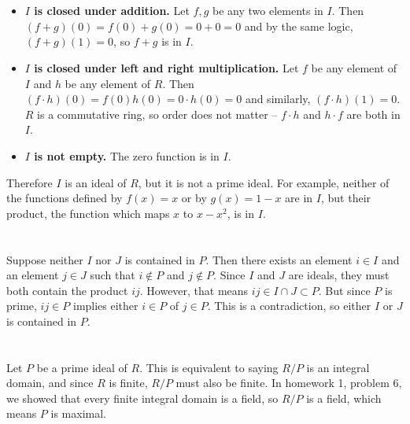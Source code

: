 \documentclass[12pt]{article}
\begin{document}
\section{}
\noindent{}\bigskip\par
\begin{itemize}
    \item \textbf{$I$ is closed under addition.} Let $f,g$ be any two elements in $I$. Then $(f+g)(0)=f(0)+g(0)=0+0=0$ and by the same logic, $(f+g)(1)=0$, so $f+g$ is in $I$.
    \item \textbf{$I$ is closed under left and right multiplication.} Let $f$ be any element of $I$ and $h$ be any element of $R$. Then $(f \cdot h)(0)=f(0)h(0)=0\cdot h(0)=0$ and similarly, $(f \cdot h)(1)=0$. $R$ is a commutative ring, so order does not matter -- $f \cdot h$ and $h \cdot f$ are both in $I$.
    \item \textbf{$I$ is not empty.} The zero function is in $I$.
\end{itemize}
Therefore $I$ is an ideal of $R$, but it is not a prime ideal. For example, neither of the functions defined by $f(x)=x$ or by $g(x)=1-x$ are in $I$, but their product, the function which maps $x$ to $x-x^2$, is in $I$.

\section{}
\noindent{}\bigskip\par
Suppose neither $I$ nor $J$ is contained in $P$. Then there exists an element $i \in I$ and an element $j \in J$ such that $i \not\in P$ and $j \not\in P$. Since $I$ and $J$ are ideals, they must both contain the product $ij$. However, that means $ij \in I \cap J \subset P$. But since $P$ is prime, $ij \in P$ implies either $i \in P$ of $j \in P$. This is a contradiction, so either $I$ or $J$ is contained in $P$.

\section{}
\noindent{}\bigskip\par
Let $P$ be a prime ideal of $R$. This is equivalent to saying $R/P$ is an integral domain, and since $R$ is finite, $R/P$ must also be finite. In homework 1, problem 6, we showed that every finite integral domain is a field, so $R/P$ is a field, which means $P$ is maximal.
\end{document}
